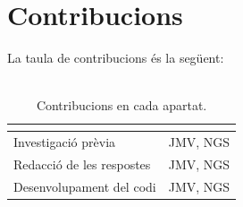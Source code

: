 \documentclass[]{scrartcl}
\begin{document}
\section{Contribucions}
La taula de contribucions és la següent:
\\\\
\begin{table}[htbp]
	\centering
	\begin{tabular}{|l|l|}
		\hline
		\rowcolor[HTML]{000078} 
		\multicolumn{1}{|c|}{\cellcolor[HTML]{000078}{\color[HTML]{FFFFFF} \textbf{Contribucions}}} &
		\multicolumn{1}{c|}{\cellcolor[HTML]{000078}{\color[HTML]{FFFFFF} \textbf{Signatura}}} \\ \hline
		Investigació prèvia       & JMV, NGS \\ \hline
		Redacció de les respostes & JMV, NGS \\ \hline
		Desenvolupament del codi  & JMV, NGS \\ \hline
	\end{tabular}
	\caption{Contribucions en cada apartat.}
	\label{tab:Taula de contribucions}
\end{table}



\end{document}
